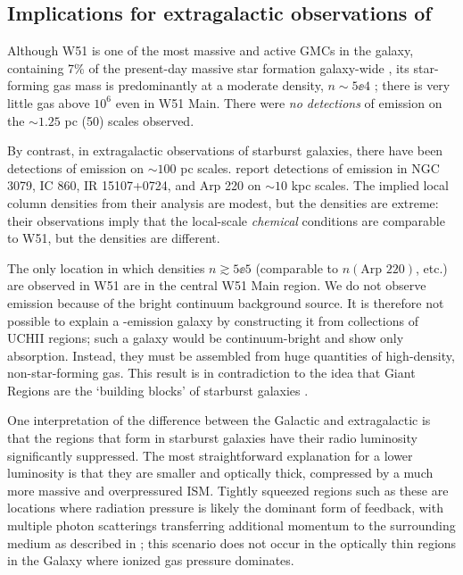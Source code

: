 \subsection{Implications for extragalactic observations of \formaldehyde}
Although W51 is one of the most massive and active GMCs in the galaxy,
containing 7\% of the present-day massive star formation galaxy-wide
\citep{Urquhart2014a}, its star-forming gas mass is predominantly at a moderate
density, $n\sim5\ee{4}$ \percc; there is very little gas above $10^6$ \percc even
in W51 Main.  There were \emph{no detections} of \formaldehyde emission on the
$\sim1.25$ pc (50\arcsec) scales observed.

By contrast, in extragalactic observations of starburst galaxies, there have
been detections of \formaldehyde emission on $\sim100$ pc scales.
\citet{Mangum2013a} report
detections of \formaldehyde \oneone emission in NGC 3079, IC 860, IR
15107+0724, and Arp 220 on $\sim10$ kpc scales.  The implied local column
densities from their analysis are modest, but the densities are extreme: their
observations imply that the local-scale \emph{chemical} conditions are
comparable to W51, but the densities are different.

The only location in which densities $n\gtrsim5\ee{5}$ \percc (comparable to
$n(\textrm{Arp } 220)$, etc.) are observed in W51 are in the central W51
Main region.  We do not observe emission because of the bright
continuum background source.  It is therefore not possible to explain a
\formaldehyde-emission galaxy by constructing it from collections of UCHII
regions; such a galaxy would be continuum-bright and show only \formaldehyde
absorption.  Instead, they must be assembled from huge quantities of
high-density, non-star-forming gas.  This result is in contradiction to the
idea that Giant \hii Regions are the `building blocks' of starburst galaxies
\citep[e.g.][]{Miura2014a}.

One interpretation of the difference between the Galactic and
extragalactic \formaldehyde is that the \hii regions that form in starburst
galaxies have their radio luminosity significantly suppressed.  The most
straightforward explanation for a lower luminosity is that they are smaller and
optically thick, compressed by a much more massive and overpressured
ISM.  Tightly squeezed \hii regions such as these are locations where radiation
pressure is likely the dominant form of feedback, with multiple photon
scatterings transferring additional momentum to the surrounding medium as
described in \citet{Murray2010b}; this scenario does not occur in the optically
thin \hii regions in the Galaxy where ionized gas pressure dominates.


